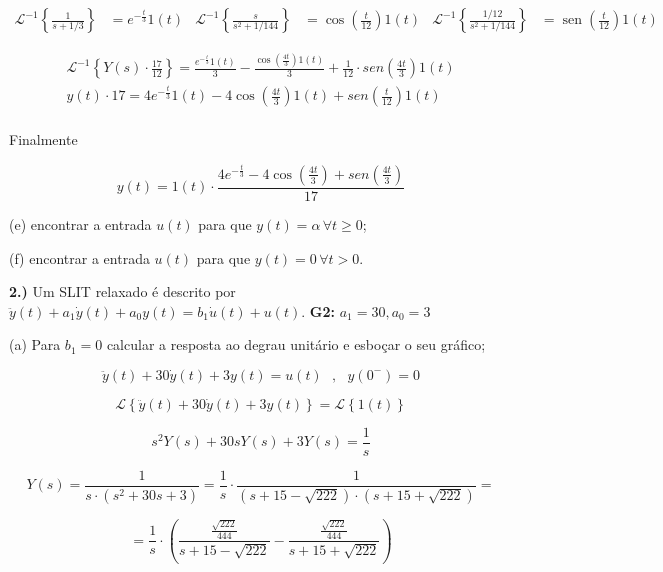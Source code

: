 \documentclass{article}
\DeclareMathOperator{\sen}{sen}
\begin{document}
\begin{align*}
    \mathcal{L}^{-1} \left\{\frac{1}{s + 1/3}\right\} &= e^{-\frac{t}{3}}1(t) & \mathcal{L}^{-1} \left\{\frac{s}{s^2 + 1/144}\right\} &= \cos\left(\frac{t}{12}\right)1(t) & \mathcal{L}^{-1} \left\{\frac{1/12}{s^2 + 1/144}\right\} &= \sen\left(\frac{t}{12}\right)1(t)
\end{align*}

\begin{align*}
    \mathcal{L}^{-1} \left\{Y(s) \cdot \frac{17}{12}\right\} = \frac{e^{-\frac{t}{3}}1(t)}{3} - \frac{\cos\left(\frac{4t}{3}\right)1(t)}{3} + \frac{1}{12}\cdot sen\left(\frac{4t}{3}\right)1(t)\\
    y(t) \cdot 17 = 4e^{-\frac{t}{3}}1(t) - 4\cos\left(\frac{4t}{3}\right)1(t) + sen\left(\frac{t}{12}\right)1(t)\\
\end{align*}

Finalmente

\[y(t) = 1(t)\cdot\frac{4e^{-\frac{t}{3}} - 4\cos\left(\frac{4t}{3}\right) + sen\left(\frac{4t}{3}\right)}{17}\]

(e) encontrar a entrada $u(t)$ para que $y(t) = \alpha\,\forall t \geq 0$;

(f) encontrar a entrada $u(t)$ para que  $y(t) = 0\,\forall t > 0$.


\vspace{\baselineskip}


\textbf{2.)} Um SLIT relaxado é descrito por $\ddot{y}(t) + a_1\dot{y}(t) + a_0y(t) = b_1\dot{u}(t) + u(t)$.
\textbf{G2:} $a_1 = 30, a_0 = 3$

(a) Para $b_1 = 0$ calcular a resposta ao degrau unitário e esboçar o seu gráfico;

\vspace{\baselineskip}

\[\ddot{y}(t) + 30\dot{y}(t) + 3y(t) = u(t)\,\,\,\,,\,\,\,\,y(0^{-}) = 0\]

\[\mathcal{L} \left\{\ddot{y}(t) + 30\dot{y}(t) + 3y(t)\right\} = \mathcal{L} \left\{1(t)\right\}\]

\[ s^{2}Y(s) + 30sY(s) + 3Y(s) = \frac{1}{s} \]

\[ Y(s) = \frac{1}{s \cdot (s^{2} + 30s + 3)} = \frac{1}{s} \cdot \frac{1}{(s + 15 - \sqrt{222}) \cdot (s + 15 + \sqrt{222})} =\]

\[ = \frac{1}{s} \cdot \left(\frac{ \frac{\sqrt{222}}{444}}{s + 15 - \sqrt{222}} - \frac{\frac{\sqrt{222}}{444}}{s + 15 + \sqrt{222}}\right) \]
\end{document}
